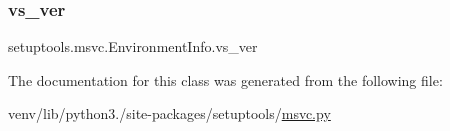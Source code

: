 \subsubsection{\texorpdfstring{vs\+\_\+ver}{vs\_ver}}
{\footnotesize\ttfamily setuptools.\+msvc.\+Environment\+Info.\+vs\+\_\+ver}



The documentation for this class was generated from the following file\+:\begin{DoxyCompactItemize}
\item 
venv/lib/python3./site-\/packages/setuptools/\hyperlink{msvc_8py}{msvc.\+py}\end{DoxyCompactItemize}
